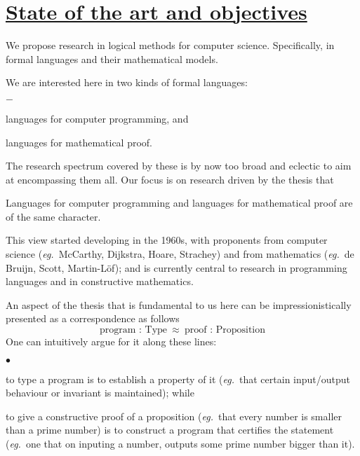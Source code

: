 \documentclass[11pt,twocolumn]{article}
\newenvironment{myitemize}
  {\begin{list}{$\bullet$}
  {\setlength{\topsep}{2pt}
   \setlength{\partopsep}{2pt}
   \setlength{\itemsep}{2.5pt}
   \setlength{\parsep}{2.5pt}
   \setlength{\leftmargin}{1em}
   \setlength{\labelwidth}{.5em}}}
  {\end{list}}
\newenvironment{myindentitemize}
  {\begin{list}{$-$}
  {\setlength{\topsep}{2pt}
   \setlength{\partopsep}{2pt}
   \setlength{\itemsep}{2.5pt}
   \setlength{\parsep}{2.5pt}
   \setlength{\leftmargin}{2.125em}
   \setlength{\labelwidth}{1.625em}}}
  {\end{list}}
\newenvironment{myquote}
  {\begin{list}{}
  {\setlength{\topsep}{2pt}
   \setlength{\partopsep}{2pt}
   \setlength{\itemsep}{2.5pt}
   \setlength{\parsep}{2.5pt}
   \setlength{\rightmargin}{1em}
   \setlength{\leftmargin}{1em}
   \setlength{\labelwidth}{.5em}}}
  {\end{list}}
\newcommand{\eg}{\emph{eg.}}
\begin{document}
\setlength{\abovedisplayskip}{5pt}
\setlength{\belowdisplayskip}{5pt}



\section{\underline{State of the art and ob}j\underline{ectives}}
\label{StateOfTheArtSection}

We propose research in logical methods for computer science.
Specifically, in formal languages and their mathematical models.

We are interested here in two kinds of formal languages:
\begin{myindentitemize}
  \item
    languages for computer programming, and 
  \item
    languages for mathematical proof.
\end{myindentitemize}
The research spectrum covered by these is by now too broad and eclectic to aim
at encompassing them all.  Our focus is on research driven by the thesis that
\begin{myquote}
\item
Languages 
for computer programming
and languages 
for mathematical proof 
are of the same character.
\end{myquote}
This view %
started developing in the 1960s, with proponents from computer science
(\eg~McCarthy, Dijkstra, Hoare, Strachey) and from mathematics (\eg~de Bruijn,
Scott, Martin-L\"of); and is currently central to research in programming
languages and in constructive mathematics.

An aspect of the thesis that is fundamental to us here
can be 
impressionistically %
presented as a correspondence as follows
\begin{equation}\label{PATproportion}%
  \mbox{program : Type} \enspace \approx \enspace \mbox{proof : Proposition} 
\end{equation}
One can intuitively argue for it along 
these lines: %
\begin{myitemize} 
\item 
  to type a program is to establish a property of it (\eg~that certain
  input/output behaviour or invariant is maintained); while 
\item 
  to give a constructive proof of a proposition (\eg~that every number is
  smaller than a prime number) is to construct a program that certifies the
  statement (\eg~one that on inputing a number, outputs some prime number
  bigger than it).
\end{myitemize} 
\end{document}
